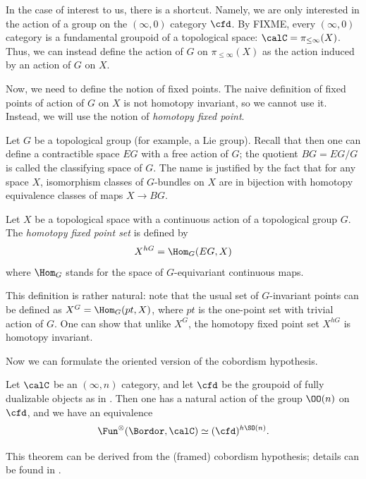 In the case of interest to us, there is a shortcut.  Namely, we are only
interested in the action of a group on the $(\infty,0)$ category $\cfd$. By
FIXME, every $(\infty, 0)$ category is a fundamental groupoid of a topological
space: $\calC=\pi_{\le \infty}(X)$. Thus, we can instead  define the action of
$G$ on $\pi_{\le \infty}(X)$ as the action induced by an action of $G$ on $X$.


Now, we need to define the notion of fixed points. The naive definition of fixed
points of action of $G$ on $X$ is not homotopy invariant, so we cannot use it.
Instead, we will  use the notion of \emph{homotopy fixed point}.

Let $G$ be a topological group (for example, a Lie group). Recall
that then one can define a contractible space $EG$ with a free action of
$G$; the quotient $BG=EG/G$ is called the classifying space of $G$. The name is
justified by the fact that for any space $X$, isomorphism classes of $G$-bundles
on $X$ are in bijection with homotopy equivalence classes of maps $X\to BG$.

\begin{definition}\label{d:homotopy-fixed}
  Let $X$ be a topological space with a continuous action of a topological
  group $G$. The \emph{homotopy fixed point set} is
  defined by
  $$
    X^{hG} =\Hom_G(EG, X)
  $$
  where $\Hom_G$ stands for the space of $G$-equivariant continuous maps.
\end{definition}

This definition is rather natural: note that the usual set of $G$-invariant
points can be defined as   $X^G=\Hom_G(pt, X)$, where $pt$ is the one-point set
with trivial action of $G$. One can show that unlike $X^G$, the homotopy fixed
point set $X^{hG}$ is homotopy invariant.

Now we can formulate the oriented version of the cobordism hypothesis.

\begin{theorem}\label{t:cob-hyp-or}
  Let $\calC$ be an $(\infty, n)$ category, and let $\cfd$ be the
  groupoid of fully dualizable objects as in .
  Then one has a natural action
  of the group $\OO(n)$ on $\cfd$, and we have an equivalence
  $$
    \Fun^{\otimes}(\Bordor, \calC)\simeq (\cfd)^{h\SO(n)}.
  $$
  \end{theorem}
This theorem can be  derived from the (framed) cobordism hypothesis;
details can be found in \cite{lurie-cobordism}.

